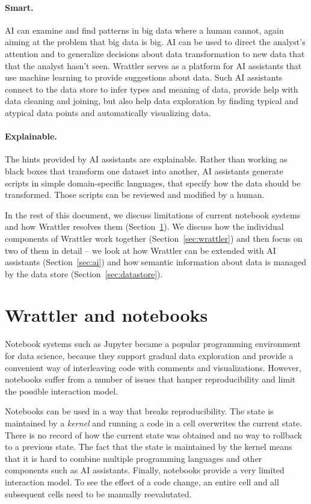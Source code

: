 \documentclass[sigplan,preprint,10pt]{acmart}\settopmatter{printfolios=true,printccs=false,printacmref=false}
\theoremstyle{plain}
\theoremstyle{definition}
\begin{document}
\paragraph{Smart.}
AI can examine and find patterns
in big data where a human cannot,
again aiming at the problem that
big data is big.
AI can be used to direct the analyst's attention and to generalize  decisions about data transformation
to new data that that the analyst
hasn't seen.
Wrattler serves as a platform for AI assistants that use machine learning to provide suggestions
about data. Such AI assistants connect to the data store to infer types and meaning of data, provide
help with data cleaning and joining, but also help data exploration by finding typical and atypical
data points and automatically visualizing data.

\paragraph{Explainable.}
The hints provided by AI assistants are explainable. Rather than working as black boxes that
transform one dataset into another, AI assistants generate scripts in simple domain-specific
languages, that specify how the data should be transformed. Those scripts can be reviewed
and modified by a human.

\vspace{0.5em}
\noindent
In the rest of this document, we discuss limitations of current notebook systems and how Wrattler
resolves them (Section~\ref{sec:overview}). We discuss how the individual components of Wrattler
work together (Section~\ref{sec:wrattler}) and then focus on two of them in detail --
we look at how Wrattler can be extended with AI assistants (Section~\ref{sec:ai}) and
how semantic information about data is managed by the data store (Section~\ref{sec:datastore}).


\section{Wrattler and notebooks}
\label{sec:overview}

Notebook systems such as Jupyter became a popular programming environment for data science, because
they support gradual data exploration and provide a convenient way of interleaving code with
comments and visualizations. However, notebooks suffer from a number of issues that hanper
reproducibility and limit the possible interaction model.

Notebooks can be used in a way that breaks reproducibility. The state is maintained by a \emph{kernel}
and running a code in a cell overwrites the current state. There is no record of how the current
state was obtained and no way to rollback to a previous state. The fact that the state is
maintained by the kernel means that it is hard to combine multiple programming languages and
other components such as AI assistants. Finally, notebooks provide a very limited interaction
model. To see the effect of a code change, an entire cell and all subsequent cells need to be
manually reevalutated.
\end{document}
